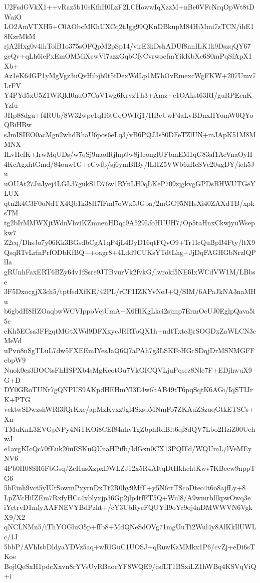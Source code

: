 U2FsdGVkX1++vRaz5b10sKfhH0LzF2LCHowwIqXzzM+nBe0VFcNrqOpWt8tDWaiO
LO2AmVTXH5+C0AObcMKhUXCq2tJgg99QKnDBkupM84HiMmi7zTCN/ihE18KzrMkM
rjA2Hxg0v4ihTolB1o375sOFQpM2pSp14/virE3kDshADUf8nnILK1k9DszqQY67
geQv+qLh6iePxEmOMMiXcwVl7azzGqbCfyCvrwoefmYikKbXc6S0mPqSlApX1Xb+
Az1eK64GP1yMgVgz3uQvHibjb9t5fDexWdLp1M7hOvRmexcWgFKW+207Umv7LrFV
Y4PYd5xU5Z1WiQkI0nuO7CaV1wg6KryzTh3+Amz+e1OAkst63RI/guRPEenKYzfu
JHp88dgu+f4RUb/8W32wpc1qH6tGqOWRj1/HBcUwP4aLvBDnxHYomW0QYoQBiHRw
sJmISIEO0acMgn2whdRhaU6pos6eLq3/vB6PQJ3s80DFeTZlUN+mJApK51M8MMNX
ILvHefK+IrwMqUDs/w7qSj9uaolRjlnp9w8jJronglUFbmEM1qG83af1AeVnaOyH
4KcAgxhtGmd/84ouw1G+eCwfb/sj6ymBfBy/lLHZ5VWb6zReSVc20ugDY/ieh5Ju
uOUAt27JuJyej4LGL37gukS1D76w1RYnLH0qLKeP709zjgkvgGPDsBHWUTGeYLUX
qtn2k4C3F0oNdTX4Qb1k38H7fFml7oWx5JGba/2mGG95NHsXi40ZAXdTB/xpksTM
tg2bIrMMWXjtWdnVhviKZmnenHDqc9A529LfoHUUH7/Op5taHnxCkwjyuWsepkw7
Z2cq/DhsJo7y06Kk3BGsdbCgA1qF4jL4DyD16qtFQvO9+Tr1IcQuBpB4Fty/ltX9
QsqRTvLrfnPrfODbKfBQ++oagr8+4Ldd9CUKsYTdtLhg+JjDqFAGHGbNrzlQPlIa
gRUnhFaxERT6BZy64v1fSsre9JTBvurVk2fvkG/lwrokf5NE6IxWCdVW1M/LBbse
3F5DxocgjX3ch5/tptfedXfKE/42PL/rCF1IZKYvNeJ+Q/SIM/6APaJkNA3naMHu
b6gbdH8HZOaqbwWCVIppoVejUmA+X6HlKgLkci2sjmp7ErmOcUJ0EglpQava5i5c
eKh5ECsa3FFgqtMGtXWd9DFXxycJRRToQX1h+ndtTxtc3jrSOGDxZaWLCN3cMeVd
uPvn8nSgTLuL7dw5FXEEmIYesJaQ6Q7aPAh7g3LSKFoHGcSDqjDrMSNMGFFebpW9
Nuok0ez3BOCtsFhHSPXb4sMgKeotOu7VkGICQVLjuPqsez8Nle7F+EDjhwuX9G+D
DY0GRoTUNr7gQNPUS9AKpdHEHmYl3E4w6hAB49tT6pqSqtK6AGi/IqSTIJrK+PTG
vcktwSDwzshWRl3fQrKxe/apMzKyxz9gl4SxsbMNmFo7ZKAuZSzuqGtkETSCs+Xn
TMuKnL3EVGpNPy4NiTKOi8CEf84nhvTgZbphRdBlt6qf8dQV7Lbo2HziZ00UehwJ
e1avgKIcQc70fEuk26uESKuQUuaHPifb/IdGxn0CX13PQIFd/WQUmL/lVeMEyNV6
4Pb0H08SR6FbGsq/ZeHusXzpxDWLZJ12x5R4AItqDtHkhehtKwv7KBecw9nppTG6
5bEinh9vct5yIUrSowmPxyrnDxTt2R0hy9MfF+y5N6rrTScoDteo4t6o8ajfLy+8
LpZVcHiIZEm7RxfyHCc4xblyxjp36Gp2jlp4tfFT5Q+Wul8/A9wmrbllkpwOwq3e
iYetrvD1mlyAAFNEVYBdPzht+/cY3UbRyeFQUYfI9oYc9oj4nDMWWVN6VgkX9/X2
qNCLNMn5/iThYOGluO5p+fIb8+MdQNeSdOVg71mgUuTi2Wul4y8AlKkIlUWLc/1J
5bbP/AVhIsbDldyaYDVz5aq+wRlGuC1UOSJ+qRuwKzMMkx1P6/cvZj+eDi6sTKoe
BojlQeSxH1pdcXxvn8rYVsUyRBaocYF8WQE9/csfLT1BSxiLZ1hWBq4KSVqViQ+i
